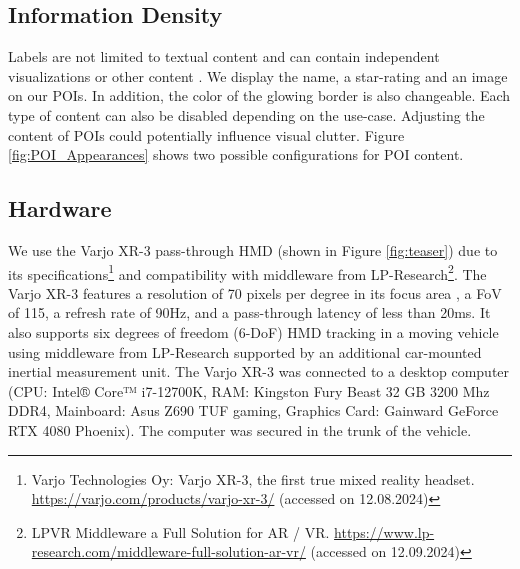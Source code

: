 \subsection{Information Density}
\label{sec:system_informationdensity}
Labels are not limited to textual content and can contain independent visualizations or other content \cite{Lee24SituatedVisAR}. We display the name, a star-rating and an image on our POIs. In addition, the color of the glowing border is also changeable. Each type of content can also be disabled depending on the use-case. Adjusting the content of POIs could potentially influence visual clutter. Figure \ref{fig:POI_Appearances} shows two possible configurations for POI content.
 

\subsection{Hardware}
We use the Varjo XR-3 pass-through HMD (shown in Figure \ref{fig:teaser}) due to its specifications\footnote{Varjo Technologies Oy: Varjo XR-3, the first true mixed reality headset. \url{https://varjo.com/products/varjo-xr-3/} (accessed on 12.08.2024)} and compatibility with middleware from LP-Research\footnote{LPVR Middleware a Full Solution for AR / VR. \url{https://www.lp-research.com/middleware-full-solution-ar-vr/} (accessed on 12.09.2024)}. The Varjo XR-3 features a resolution of 70 pixels per degree in its focus area \cite{Kappler22VarjoEvaluation}, a FoV of 115, a refresh rate of 90Hz, and a pass-through latency of less than 20ms. It also supports six degrees of freedom (6-DoF) HMD tracking in a moving vehicle using middleware from LP-Research supported by an additional car-mounted inertial measurement unit. The Varjo XR-3 was connected to a desktop computer (CPU: Intel® Core™ i7-12700K,
RAM: Kingston Fury Beast 32 GB 3200 Mhz DDR4, Mainboard: Asus Z690 TUF gaming, Graphics Card: Gainward GeForce RTX 4080 Phoenix). The computer was secured in the trunk of the vehicle.